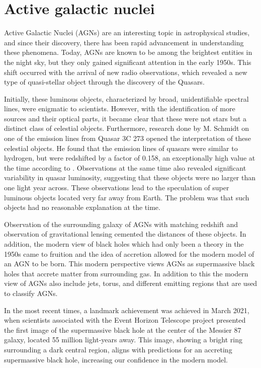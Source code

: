 \section{Active galactic nuclei}




Active Galactic Nuclei (AGNs) are an interesting topic in astrophysical studies, and 
since their discovery, there has been rapid advancement in understanding these phenomena.
Today, AGNs are known to be among the brightest entities in the night sky,
but they only gained significant attention in the early 1950s. 
This shift occurred with the arrival of new radio observations, which revealed a new type of quasi-stellar
object through the discovery of the Quasars.

Initially, these luminous objects, characterized by broad, 
unidentifiable spectral lines, were enigmatic to scientists. 
However, with the identification of more sources and their optical parts, 
it became clear that these were not stars but a distinct class of celestial objects. 
Furthermore, research done by M. Schmidt on one of the emission lines from 
Quasar 3C 273 opened the interpretation of these celestial objects. 
He found that the emission lines of quasars were similar to hydrogen, but were redshifted by a factor of 0.158,
an exceptionally high value at the time according to \cite{Shields_1999}. Observations at the same time also revealed significant 
variability in quasar luminosity, suggesting that these objects were no larger than one light year across. 
These observations lead to the speculation of super luminous objects located very far away from Earth. The problem was that such objects
had no reasonable explanation at the time. %

Observation of the surrounding galaxy of AGNs with matching redshift and observation of gravitational lensing cemented 
the distances of these objects. In addition, the modern view of black holes which had only been a theory in the 1950s came to
fruition and the idea of accretion allowed for the modern model of an AGN to be born. This modern perspective views AGNs as supermassive black holes that
accrete matter from surrounding gas. In addition to this the modern view of AGNs also include jets, torus, and different emitting regions that are used to classify AGNs.

In the most recent times, a landmark achievement was achieved in March 2021, when scientists associated with the Event Horizon Telescope project 
presented the first image of the supermassive black hole at the center of the Messier 87 galaxy, located 55 million light-years away.
This image, showing a bright ring surrounding a dark central region, aligns with predictions for an accreting supermassive black hole, 
increasing our confidence in the modern model. 

